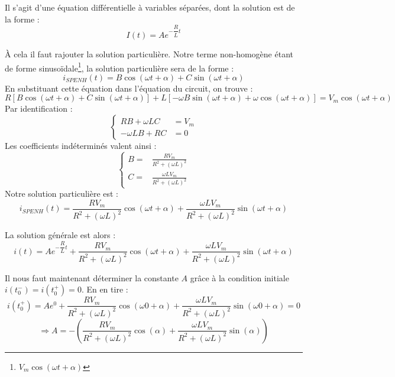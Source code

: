 \documentclass	[11pt, a4paper, openany]{book}
\begin{document}
Il s'agit d'une équation différentielle à variables séparées, dont la solution est de la forme :
\begin{equation}
I(t) = A e^ {- \dfrac{R}{L} t}
\end{equation}

À cela il faut rajouter la solution particulière. Notre terme non-homogène étant de forme sinusoïdale\footnote{$V_m\cos(\omega t + \alpha)$},
la solution particulière sera de la forme :
\begin{equation}
i_{SPENH}(t) = B\cos(\omega t + \alpha) + C\sin(\omega t + \alpha)
\end{equation}
En substituant cette équation dans l'équation du circuit, on trouve : 
\begin{equation}
R[B\cos(\omega t + \alpha) + C\sin(\omega t + \alpha)] + L[-\omega B\sin(\omega t + \alpha)+\omega\cos(\omega t + \alpha)] = V_m\cos(\omega t + \alpha)
\end{equation}
Par identification :
\begin{equation}
\left\{\begin{array}{ll}
 RB + \omega LC & = V_m  \\
 -\omega LB + RC & = 0 
\end{array}\right.
\end{equation}
Les coefficients indéterminés valent ainsi :
\begin{equation}
\left\{\begin{array}{ll}
 B = & \frac{RV_m}{R^2 + (\omega L)^2}  \\
 C = &  \frac{\omega LV_m}{R^2 + (\omega L)^2}
\end{array}\right.
\end{equation}
Notre solution particulière est :
\begin{equation}
i_{SPENH}(t) = \frac{RV_m}{R^2 + (\omega L)^2}\cos(\omega t + \alpha) +  \frac{\omega LV_m}{R^2 + (\omega L)^2}\sin(\omega t + \alpha)
\end{equation}

La solution générale est alors :
\begin{equation}
i(t) = A e^ {- \dfrac{R}{L} t} + \frac{RV_m}{R^2 + (\omega L)^2}\cos(\omega t + \alpha) +  \frac{\omega LV_m}{R^2 + (\omega L)^2}\sin(\omega t + \alpha)
\end{equation}

Il nous faut maintenant déterminer la constante $A$ grâce à la condition initiale $i(t_0^-) = i(t_0^+) = 0$. En en tire :
\begin{equation}
i(t_0^+) = Ae^0 + \frac{RV_m}{R^2 + (\omega L)^2}\cos(\omega 0 + \alpha) +  \frac{\omega LV_m}{R^2 + (\omega L)^2}\sin(\omega 0 + \alpha) = 0
\end{equation}
\begin{equation}
\Rightarrow A = -\left(\frac{RV_m}{R^2 + (\omega L)^2}\cos(\alpha) +  \frac{\omega LV_m}{R^2 + (\omega L)^2}\sin(\alpha)\right)
\end{equation}
\end{document}
